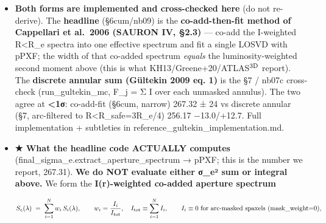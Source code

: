 \documentclass[
]{article}
\newcommand{\BreakablePath}[1]{{\ttfamily\sloppy #1}}
\begin{document}
\begin{itemize}
\begin{itemize}
    This discrete spaxel/bin sum \textbf{is Cappellari et al.~2013
    (ATLAS3D XV, MNRAS 432, 1709) eq. 29} ---
    \(\langle v_{\rm rms}^2\rangle_e \equiv \langle V^2+\sigma^2\rangle_e \equiv \sum_i F_i(V_i^2+\sigma_i^2)/\sum_i F_i\)
    --- equivalently the discretised form of the Gültekin 2009 eq. 1
    integral. (Their eq. 29 also carries an
    \textbf{inclination/projection element} in the dynamical-model
    framework; our §7 uses the \emph{observed-plane} projected
    \(V_n,\sigma_n\) directly and omits that term.) \textbf{It is NOT
    ``Cappellari 2006 eq. 1''} --- a prior draft mis-cited it there;
    Cappellari 2006 eq. 1 is the aperture correction
    \((\sigma_R/\sigma_e)=(R/R_e)^{-0.066}\), and its σ\_e (SAURON IV
    §2.3) is the co-add-then-fit method below. {[}eq. numbers verified
    2026-06-12: Cappellari 2006 eq. 1, Cappellari 2013 eq. 29, Gültekin
    2009 eq. 1{]}
  \end{itemize}
\item
  \textbf{Both forms are implemented and cross-checked here} (do not
  re-derive). The \textbf{headline} (§6cum/nb09) is the
  \textbf{co-add-then-fit method of Cappellari et al.~2006 (SAURON IV,
  §2.3)} --- co-add the I-weighted R\textless R\_e spectra into one
  effective spectrum and fit a single LOSVD with pPXF; the width of that
  co-added spectrum \emph{equals} the luminosity-weighted second moment
  above (this is what KH13/Greene+20/ATLAS\(^{\rm 3D}\) report). The
  \textbf{discrete annular sum (Gültekin 2009 eq. 1)} is the §7 / nb07c
  cross-check
  (\BreakablePath{run\_\discretionary{}{}{}gultekin\_\discretionary{}{}{}mc},
  F\_j = Σ I over each unmasked annulus). The two agree at
  \textbf{\textless1σ}: co-add-fit (§6cum, narrow) 267.32 ± 24 vs
  discrete annular (§7, arc-filtered to R\textless R\_safe=3R\_e/4)
  256.17 −13.0/+12.7. Full implementation + subtleties in
  \BreakablePath{reference\_\discretionary{}{}{}gultekin\_\discretionary{}{}{}implementation.\discretionary{}{}{}md}.
\item
  \textbf{★ What the headline code ACTUALLY computes}
  (\BreakablePath{final\_\discretionary{}{}{}sigma\_\discretionary{}{}{}e.\discretionary{}{}{}extract\_\discretionary{}{}{}aperture\_\discretionary{}{}{}spectrum}
  → pPXF; this is the number we report, 267.31). \textbf{We do NOT
  evaluate either σ\_e² sum or integral above.} We form the
  \textbf{I(r)-weighted co-added aperture spectrum}

  \[S_e(\lambda) \;=\; \sum_{i=1}^{N} w_i\, S_i(\lambda), \qquad
    w_i = \frac{I_i}{I_{\rm tot}}, \quad I_{\rm tot} \equiv \sum_{i=1}^{N} I_i, \qquad
    I_i \equiv 0 \ \text{for arc-masked spaxels (mask\_weight=0)},\]


\end{itemize}
\end{document}
